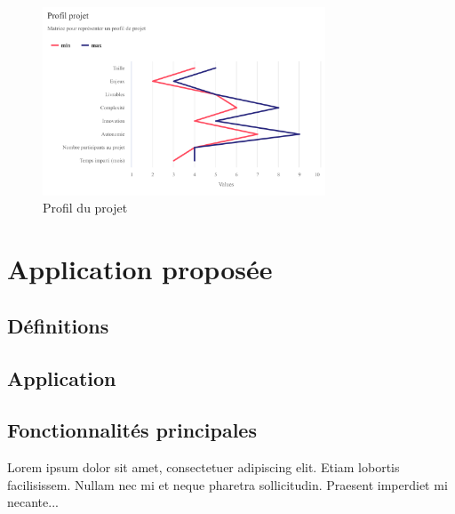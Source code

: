 \documentclass[french,a4paper]{article}
\begin{document}
\begin{figure}[h]
    \centering
    \includegraphics[width=0.75\textwidth]{img/profil_projet.png}
    \caption{Profil du projet}
    \label{fig:mesh1}
\end{figure}

\newpage
\section{Application proposée}
\subsection{Définitions}
\subsection{Application}
\subsection{Fonctionnalités principales}

Lorem ipsum dolor sit amet, consectetuer adipiscing elit. Etiam lobortis
facilisissem. Nullam nec mi et neque pharetra sollicitudin. Praesent imperdiet
mi necante...
\end{document}
